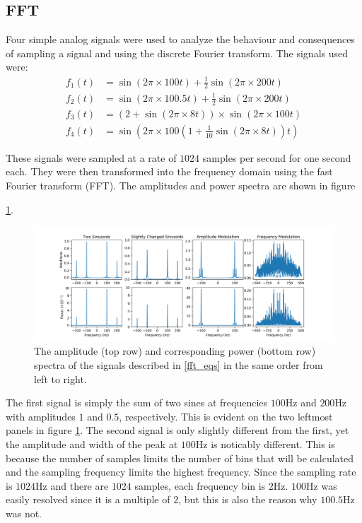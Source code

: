 \documentclass[twocolumn]{article}
\begin{document}
\subsection{FFT}
Four simple analog signals were used to analyze the behaviour and consequences
of sampling a signal and using the discrete Fourier transform. The signals used
were:
\begin{equation}
  \begin{aligned}
    f_1(t)  &= \sin(2 \pi \times 100 t) + \frac{1}{2} \sin(2 \pi \times 200 t) \\
    f_2(t) &= \sin(2 \pi \times 100.5 t) + \frac{1}{2} \sin(2 \pi \times 200 t) \\
    f_3(t) &= \left( 2 + \sin(2 \pi \times 8 t) \right) \times \sin(2 \pi \times 100 t) \\
    f_4(t) &= \sin \left( 2 \pi \times 100 \left( 1 + \frac{1}{10} \sin(2 \pi \times 8 t) \right) t \right)
  \end{aligned}
  \label{fft_eqs}
\end{equation}

These signals were sampled at a rate of $1024$ samples per second for one second
each. They were then transformed into the frequency domain using the fast
Fourier transform (FFT). The amplitudes and power spectra are shown in figure

\ref{fig:fft_exs}.
\begin{figure}
  \includegraphics[width=\pagewidth]{fft_examples.png}
  \caption{
    The amplitude (top row) and corresponding power (bottom row) spectra of the
    signals described in \ref{fft_eqs} in the same order from left to right.
  }
  \label{fig:fft_exs}
\end{figure}

The first signal is simply the sum of two sines at frequencies $100$Hz and
$200$Hz with amplitudes $1$ and $0.5$, respectively. This is evident on the
two leftmost panels in figure \ref{fig:fft_exs}. The second signal is only
slightly different from the first, yet the amplitude and width of the peak at
$100$Hz is noticably different. This is because the number of samples limits the
number of bins that will be calculated and the sampling frequency limits the
highest frequency. Since the sampling rate is $1024$Hz and there are $1024$
samples, each frequency bin is $2$Hz. $100$Hz was easily resolved since it is a
multiple of $2$, but this is also the reason why $100.5$Hz was not.
\end{document}
